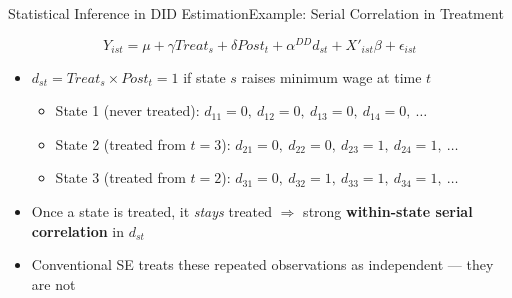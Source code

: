 \documentclass[dvipsnames,hyperref={pdfpagelabels=false}]{beamer}
\begin{document}
\begin{frame}{Statistical Inference in DID Estimation}{Example: Serial Correlation in Treatment}

    \begin{equation*}
        Y_{ist} = \mu + \gamma Treat_{s} + \delta Post_{t} + \alpha^{DD} d_{st} + X'_{ist}\beta + \epsilon_{ist}
    \end{equation*}

    \begin{itemize}
        \item $d_{st} = Treat_{s} \times Post_{t} = 1$ if state $s$ raises minimum wage at time $t$
        \vspace{0.2cm}
        \begin{itemize}
            \item State 1 (never treated): $d_{11} = 0,\ d_{12} = 0,\ d_{13} = 0,\ d_{14} = 0,\ \ldots$
            \vspace{0.2cm}
            \item State 2 (treated from $t=3$): $d_{21} = 0,\ d_{22} = 0,\ d_{23} = 1,\ d_{24} = 1,\ \ldots$
            \vspace{0.2cm}
            \item State 3 (treated from $t=2$): $d_{31} = 0,\ d_{32} = 1,\ d_{33} = 1,\ d_{34} = 1,\ \ldots$
        \end{itemize}
        \vspace{0.2cm}
        \item[$\Rightarrow$] Once a state is treated, it \emph{stays} treated $\Rightarrow$ strong \textbf{within-state serial correlation} in $d_{st}$
        \vspace{0.2cm}
        \item[$\Rightarrow$] Conventional SE treats these repeated observations as independent --- they are not
    \end{itemize}

\end{frame}
\end{document}
